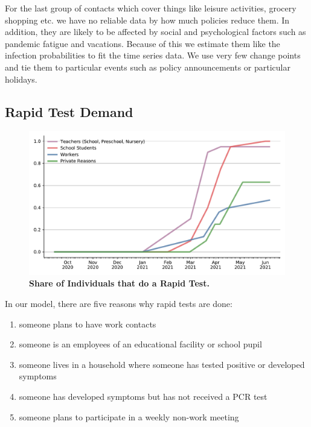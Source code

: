 
For the last group of contacts which cover things like leisure activities, grocery
shopping etc. we have no reliable data by how much policies reduce them. In addition,
they are likely to be affected by social and psychological factors such as pandemic
fatigue and vacations. Because of this we estimate them like the infection probabilities
to fit the time series data. We use very few change points and tie them to particular
events such as policy announcements or particular holidays.

\FloatBarrier

\subsection{Rapid Test Demand}


\begin{figure}
    \centering
    \includegraphics[width=\textwidth]{../figures/results/figures/data/testing/rapid_test_demand_shares}
    \caption{\textbf{Share of Individuals that do a Rapid Test.}}
    \floatfoot{\noindent \textcolor{red}{J: Talk about the interpretation of each line.}}
    \label{fig:rapid_test_demand}
\end{figure}

In our model, there are five reasons why rapid tests are done:
\begin{enumerate}
    \item someone plans to have work contacts
    \item someone is an employees of an educational facility or school pupil
    \item someone lives in a household where someone has tested positive or developed
          symptoms
    \item someone has developed symptoms but has not received a PCR test
    \item someone plans to participate in a weekly non-work meeting
\end{enumerate}

